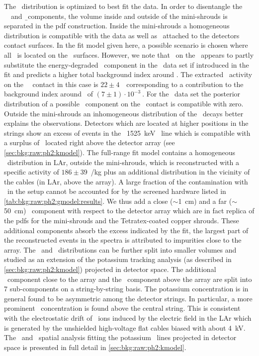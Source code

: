 The \kvz\ distribution is optimized to best fit the data. In order to disentangle the
\kvz\ \g\  and \b\ components, the volume inside and outside of the mini-shrouds is
separated in the pdf construction. Inside the mini-shrouds a homogeneous distribution is
compatible with the data as well as \kvz\ attached to the detectors contact surfaces. In
the fit model given here, a possible scenario is chosen where all \kvz\ is located on the
\nplus\ surfaces. However, we note that \kvz\ on the \pplus\ appears to partly substitute
the energy-degraded \a\ component in the \enrCoaxII\ data set if introduced in the fit and
predicts a higher total background index around \qbb. The extracted \kvz\ activity on the
\scoax\ \pplus\ contact in this case is $22\pm4$~\mubq\ corresponding to a
contribution to the background index around \qbb\ of $(7\pm1)\cdot10^{-3}~$\ctsper. For the \enrBEGeII\
data set the posterior distribution of a possible \kvz\ component on the \pplus\ contact
is compatible with zero. Outside the mini-shrouds an inhomogeneous distribution of the
\kvz\ decays better explains the observations. Detectors which are located at higher
positions in the strings show an excess of events in the \kvz\ 1525~keV \g\ line which is
compatible with a surplus of \kvz\ located right above the detector array (see
\cref{sec:bkg:raw:ph2:kmodel}). The full-range fit model contains a homogeneous \kvz\
distribution in LAr, outside the mini-shrouds, which is reconstructed with a specific
activity of $186\pm39$~\mubq/kg plus an additional distribution in the vicinity of the
cables (in LAr, above the array).
\newpar
A large fraction of the contamination with \kvn\ in the setup cannot be accounted for by
the screened hardware listed in \cref{tab:bkg:raw:ph2:gmodel:results}. We thus add a close
($\sim$1~cm) and a far ($\sim$50~cm) \kvn\ component with respect to the detector array
which are in fact replica of the pdfs for the mini-shrouds and the Tetratex\reg-coated copper
shrouds. These additional components absorb the excess indicated by the fit, the largest
part of the reconstructed events in the spectra is attributed to impurities close to the
array.
\newpar
The \kvn\ and \kvz\ distributions can be further split into smaller volumes and studied as
an extension of the potassium tracking analysis (as described in
\cref{sec:bkg:raw:ph2:kmodel}) projected in detector space. The additional \kvn\ component
close to the array and the \kvz\ component above the array are split into 7 sub-components
on a string-by-string basis. The potassium concentration is in general found to be
asymmetric among the detector strings. In particular, a more prominent \kvz\ concentration
is found above the central string. This is consistent with the electrostatic drift of
\kvz\ ions induced by the electric field in the LAr which is generated by the unshielded
high-voltage flat cables biased with about 4~kV. The \kvn\ and \kvz\ spatial analysis
fitting the potassium \g\ lines projected in detector space is presented in full detail in
\cref{sec:bkg:raw:ph2:kmodel}.

